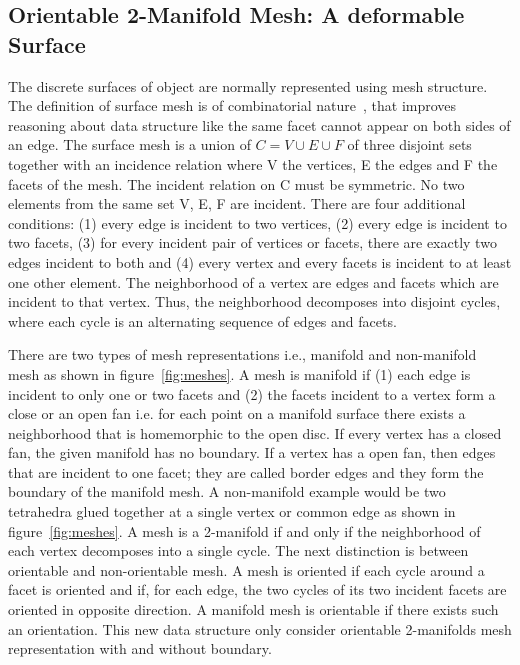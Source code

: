 \documentclass{InsightArticle}
\begin{document}
\subsection{Orientable 2-Manifold Mesh: A deformable Surface}

The discrete surfaces of object are normally represented using mesh structure. The definition of surface mesh is of combinatorial nature~\cite{Kettner1999}, that improves reasoning about data structure like the same facet cannot appear on both sides of an edge. The surface mesh is a union of $C = V \cup E \cup F$ of three disjoint sets together with an incidence relation where V the vertices, E the edges and F the facets of the mesh. The incident relation on C must be symmetric. No two elements from the same set V, E, F are incident. There are four additional conditions: (1) every edge is incident to two vertices, (2) every edge is incident to two facets, (3) for every incident pair of vertices or facets, there are exactly two edges incident to both and (4) every vertex and every facets is incident to at least one other element. The neighborhood of a vertex are edges and facets which are incident to that vertex. Thus, the neighborhood decomposes into disjoint cycles, where each cycle is an alternating sequence of edges and facets.

There are two types of mesh representations i.e., manifold and non-manifold mesh as shown in figure~\ref{fig:meshes}. A mesh is manifold if (1) each edge is incident to only one or two facets and (2) the facets incident to a vertex form a close or an open fan i.e. for each point on a manifold surface there exists a neighborhood that is homemorphic to the open disc. If every vertex has a closed fan, the given manifold has no boundary. If a vertex has a open fan, then edges that are incident to one facet; they are called border edges and they form the boundary of the manifold mesh. A non-manifold example would be two tetrahedra glued together at a single vertex or common edge as shown in figure~\ref{fig:meshes}. A mesh is a 2-manifold if and only if the neighborhood of each vertex decomposes into a single cycle. The next distinction is between orientable and non-orientable mesh. A mesh is oriented if each cycle around a facet is oriented and if, for each edge, the two cycles of its two incident facets are oriented in opposite direction. A manifold mesh is orientable if there exists such an orientation. This new data structure only consider orientable 2-manifolds mesh representation with and without boundary.
\end{document}
